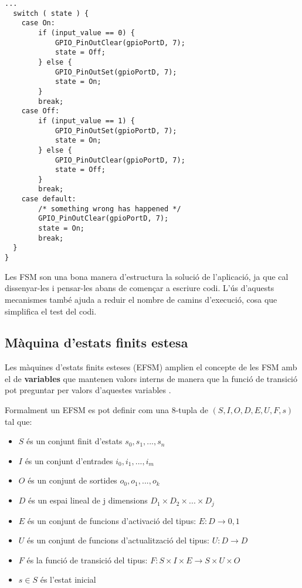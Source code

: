 \begin{lstlisting}[style=customc,caption={Codi d'exemple de GPIO},label=gpio_example_FSMMealy]
...
  switch ( state ) {
    case On:
        if (input_value == 0) {
            GPIO_PinOutClear(gpioPortD, 7);
            state = Off;
        } else {
            GPIO_PinOutSet(gpioPortD, 7);
            state = On;
        }
        break;
    case Off:
        if (input_value == 1) {
            GPIO_PinOutSet(gpioPortD, 7);
            state = On;
        } else {
            GPIO_PinOutClear(gpioPortD, 7);
            state = Off;
        }
        break;
    case default:
        /* something wrong has happened */
        GPIO_PinOutClear(gpioPortD, 7);
        state = On;
        break;
  }
}
\end{lstlisting}

Les FSM son una bona manera d'estructura la solució de l'aplicació, ja que cal dissenyar-les i pensar-les abans de començar a escriure codi. L'ús d'aquests mecanismes també ajuda a reduir el nombre de camins d'execució, cosa que simplifica el test del codi.

\subsection{Màquina d'estats finits estesa}
\label{sec:EFSM}

Les màquines d'estats finits esteses (\gls{EFSM}) amplien el concepte de les FSM amb el de {\bf variables} que mantenen valors interns de manera que la funció de transició pot preguntar per valors d'aquestes variables \cite{wiki:EFSM}.

\begin{remark}
 Formalment un EFSM es pot definir com una 8-tupla de $(S, I, O, D, E, U, F, s)$ tal que:
\begin{itemize}
 \item $S$ és un conjunt finit d'estats ${s_0,s_1, ..., s_n}$
 \item $I$ és un conjunt d'entrades ${i_0, i_1, ..., i_m}$
 \item $O$ és un conjunt de sortides ${o_0, o_1, ..., o_k}$
 \item $D$ és un espai lineal de j dimensions $D_1 \times D_2 \times ... \times D_j$
 \item $E$ és un conjunt de funcions d'activació del tipus: $E: D \to {0, 1}$
 \item $U$ és un conjunt  de funcions d'actualització del tipus: $U: D \to D$
 \item $F$ és la funció de transició del tipus: $F: S \times I \times E \to S \times U \times O$
 \item $s \in S$ és l'estat inicial 
\end{itemize}
\end{remark}

